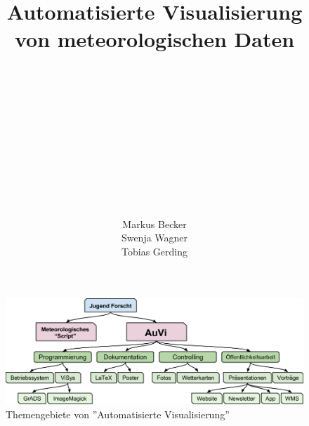 \documentclass[a4paper,oneside,12pt,titlepage]{article}
\begin{document}
\pagestyle{empty}
\title{Automatisierte Visualisierung\\von meteorologischen Daten}
\author{\\\\\\\\\\\\\\\\\\\\\\Markus Becker\\Swenja Wagner\\Tobias Gerding}

\maketitle
\pagestyle{empty}
\tableofcontents
\thispagestyle{empty}
\pagestyle{plain}
\newpage

\begin{figure}
\centering
\includegraphics[width=0.9\linewidth]{jfdetails.png} 
\caption{Themengebiete von ''Automatisierte Visualisierung''}
\label{jfdetails}
\end{figure}
\end{document}
